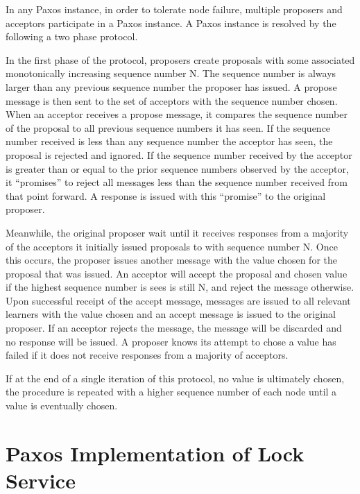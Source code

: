 \documentclass{article}
\begin{document}
In any Paxos instance, in order to tolerate node failure, multiple proposers and acceptors participate in a Paxos instance.
A Paxos instance is resolved by the following a two phase protocol.

In the first phase of the protocol, proposers create proposals with some associated monotonically increasing sequence number N. 
The sequence number is always larger than any previous sequence number the proposer has issued. 
A propose message is then sent to the set of acceptors with the sequence number chosen. 
When an acceptor receives a propose message, it compares the sequence number of the proposal to all previous sequence numbers it has seen.
If the sequence number received is less than any sequence number the acceptor has seen, the proposal is rejected and ignored.
If the sequence number received by the acceptor is greater than or equal to the prior sequence numbers observed by the acceptor, it ``promises'' to reject all messages less than the sequence number received from that point forward.
A response is issued with this ``promise'' to the original proposer.

Meanwhile, the original proposer wait until it receives responses from a majority of the acceptors it initially issued proposals to with sequence number N.
Once this occurs, the proposer issues another message with the value chosen for the proposal that was issued.
An acceptor will accept the proposal and chosen value if the highest sequence number is sees is still N, and reject the message otherwise.
Upon successful receipt of the accept message, messages are issued to all relevant learners with the value chosen and an accept message is issued to the original proposer.
If an acceptor rejects the message, the message will be discarded and no response will be issued.
A proposer knows its attempt to chose a value has failed if it does not receive responses from a majority of acceptors.

If at the end of a single iteration of this protocol, no value is ultimately chosen, the procedure is repeated with a higher sequence number of each node until a value is eventually chosen.


\section{Paxos Implementation of Lock Service}
\end{document}
